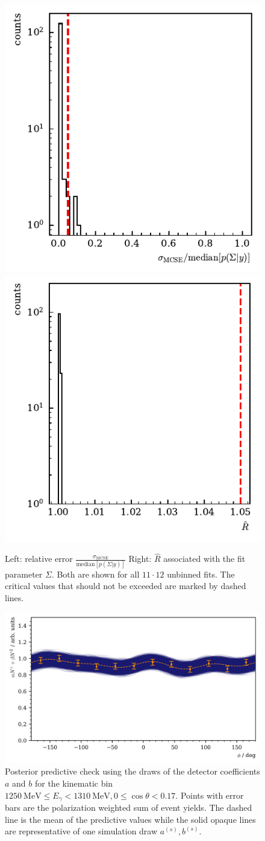  \begin{figure}[htbp]
	\includegraphics[width=.49\linewidth]{../bayes/event_based_fit/plots/mcse_hist.pdf}
	\includegraphics[width=.49\linewidth]{../bayes/event_based_fit/plots/rhat_hist.pdf}
	\caption{ Left: relative error $\frac{\sigma_\text{MCSE}}{\text{median}\left[p\left(\Sigma|y\right)\right]}$ Right: $\widehat{R}$ associated with the fit parameter $\Sigma$. Both are shown for all $11\cdot12$ unbinned fits. The critical values that should not be exceeded are marked by dashed lines.}
	\label{fig:diagnostics1}
\end{figure}
\begin{figure}[htbp]
	\centering
	\includegraphics[width=\linewidth]{../bayes/event_based_fit/plots/eff_PPC.png}
	\caption{Posterior predictive check using the draws of the detector coefficients $a$ and $b$ for the kinematic bin $\SI{1250}{\mega\eV}\leq E_\gamma<\SI{1310}{\mega\eV}, 0\leq\cos\theta<0.17$. Points with error bars are the polarization weighted sum of event yields. The dashed line is the mean of the predictive values while the solid opaque lines are representative of one simulation draw $a^{(s)},b^{(s)}$.}
	\label{fig:eff_func}
\end{figure}
